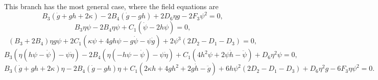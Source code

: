 \documentclass{article}
\begin{document}
This branch has the most general case, where the field equations are 
\begin{dmath}
    \label{Feq_B1_1}
    B_3\left(\dot{g} + gh + 2\kappa\right) - 2B_4\left(\dot{g} - gh\right) + 2D_6\eta g - 2F_3\psi^2 = 0,
\end{dmath}
\begin{dmath}
    \label{Feq_B1_2}
    B_3\eta\psi -2B_4\eta\psi + C_1\left(\dot{\psi} - 2h\psi\right) = 0,
\end{dmath}
\begin{dmath}
    \label{Feq_B1_3}
    \left(B_3 + 2B_4\right)\eta g\psi + 2C_1\left(\kappa\psi + 4gh\psi - g\dot{\psi} - \psi\dot{g}\right) + 2\psi^3\left(2D_2 - D_1 - D_3\right) = 0,
\end{dmath}
\begin{dmath}
    \label{Feq_B1_4}
    B_3\left(\eta\left(h\psi - \dot{\psi}\right) -\psi\dot{\eta}\right) - 2B_4\left(\eta\left(-h\psi - \dot{\psi}\right) -\psi\dot{\eta}\right) 
    + C_1\left(4h^2\psi + 2\psi\dot{h} -\ddot{\psi}\right) + D_6\eta^2\psi = 0,
\end{dmath}
\begin{dmath}
    \label{Feq_B1_5}
    B_3\left(\dot{g} + gh + 2\kappa\right)\eta - 2B_4\left(\dot{g} - gh\right)\eta + C_1\left(2\kappa h + 4gh^2 + 2g\dot{h} - \ddot{g}\right) +
    6h\psi^2\left(2D_2 - D_1 - D_3\right) + D_6 \eta^2 g - 6F_3\eta\psi^2 = 0.
\end{dmath}
\end{document}

